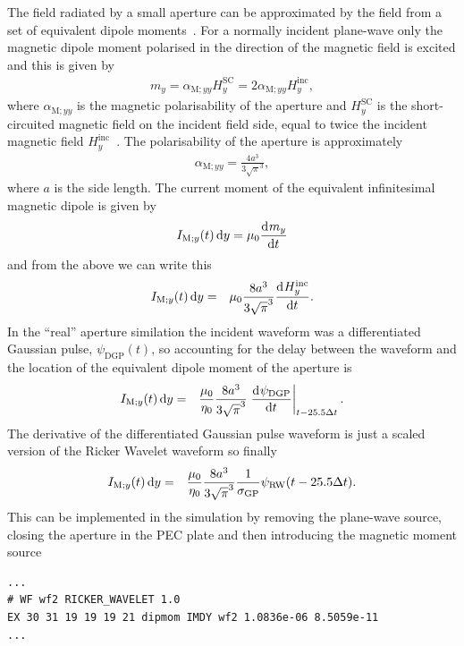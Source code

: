 \documentclass[onecolumn,a4paper]{article}
\numberwithin{equation}{section}
\begin{document}
The field radiated by a small aperture can be approximated by the field from a set of equivalent dipole
moments~\cite{Chen1974}. For a normally incident plane-wave only the magnetic dipole moment polarised in the direction of the
magnetic field is excited and this is given by
\begin{eqnarray}
m_y = \alpha_{\mathrm{M};yy} H^\mathrm{SC}_y = 2 \alpha_{\mathrm{M};yy} H^\mathrm{inc}_y,
\end{eqnarray}
where $\alpha_{\mathrm{M};yy}$ is the magnetic polarisability of the aperture and $H^\mathrm{SC}_y$ is 
the short-circuited magnetic field on the incident field side, equal to twice the incident magnetic
field $H^\mathrm{inc}_y$~\cite{McDonald1987}. The polarisability of the aperture is approximately
\begin{eqnarray}
\alpha_{\mathrm{M};yy} = \frac{4 a^3}{3 \sqrt{\pi}^3},
\end{eqnarray}
where $a$ is the side length. The current moment of the equivalent infinitesimal magnetic dipole is
given by
\begin{eqnarray}
I_{\mathrm{M};y}(t) \,\mathrm{d}{y} = \mu_0 \frac{\mathrm{d}^{}m_y}{\mathrm{d} t^{}}
\end{eqnarray}
and from the above we can write this
\begin{eqnarray}
I_{\mathrm{M};y}(t) \,\mathrm{d}{y} &=& \mu_0 \frac{8 a^3}{3 \sqrt{\pi}^3} \frac{\mathrm{d}^{}H^\mathrm{inc}_y}{\mathrm{d} t^{}}.
\end{eqnarray}
In the ``real'' aperture similation the incident waveform was a differentiated Gaussian pulse, $\psi_\mathrm{DGP}(t)$, so
accounting for the delay between the waveform and the location of the equivalent dipole moment of the aperture is
\begin{eqnarray}
I_{\mathrm{M};y}(t) \,\mathrm{d}{y} 
&=& \frac{\mu_0}{\eta_0} \frac{8 a^3}{3 \sqrt{\pi}^3} \left. \frac{\mathrm{d}^{}\psi_\mathrm{DGP}}{\mathrm{d} t^{}} \right|_{t-25.5\Delta t}.
\end{eqnarray}
The derivative of the differentiated Gaussian pulse waveform is just a scaled version of the Ricker Wavelet
waveform so finally
\begin{eqnarray}
I_{\mathrm{M};y}(t) \,\mathrm{d}{y}
&=& \frac{\mu_0}{\eta_0} \frac{8 a^3}{3 \sqrt{\pi}^3} \frac{1}{\sigma_\mathrm{GP}} \psi_\mathrm{RW}(t-25.5\Delta t).
\end{eqnarray}
This can be implemented in the simulation by removing the plane-wave source, closing the aperture in the PEC
plate and then introducing the magnetic moment source
\begin{verbatim}
...
# WF wf2 RICKER_WAVELET 1.0
EX 30 31 19 19 19 21 dipmom IMDY wf2 1.0836e-06 8.5059e-11
...
\end{verbatim}
\end{document}

